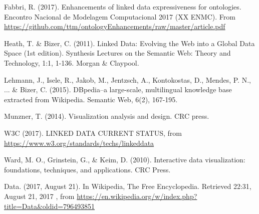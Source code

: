 \documentclass[12pt,fleqn]{article}
\begin{document}
\begin{thebibliography}{99}
\fontsize{11}{0}\selectfont
{}
	Fabbri, R. (2017). Enhancements of linked data expressiveness for ontologies.
		Encontro Nacional de Modelagem Computacional 2017 (XX ENMC).
		From \url{https://github.com/ttm/ontologyEnhancements/raw/master/article.pdf}

	Heath, T. \& Bizer, C. (2011). Linked Data: Evolving the Web into a Global Data Space (1st edition). Synthesis Lectures on the Semantic Web: Theory and Technology, 1:1, 1-136. Morgan \& Claypool.

	Lehmann, J., Isele, R., Jakob, M., Jentzsch, A., Kontokostas, D., Mendes, P. N., ... \& Bizer, C. (2015). DBpedia–a large-scale, multilingual knowledge base extracted from Wikipedia. Semantic Web, 6(2), 167-195.

	Munzner, T. (2014). Visualization analysis and design. CRC press.

	W3C (2017). LINKED DATA CURRENT STATUS, from \url{https://www.w3.org/standards/techs/linkeddata}

	Ward, M. O., Grinstein, G., \& Keim, D. (2010). Interactive data visualization: foundations, techniques, and applications. CRC Press.

	Data. (2017, August 21). In Wikipedia, The Free Encyclopedia. Retrieved
		22:31, August 21, 2017
		, from \url{https://en.wikipedia.org/w/index.php?title=Data&oldid=796493851}

\end{thebibliography}





\end{document}
